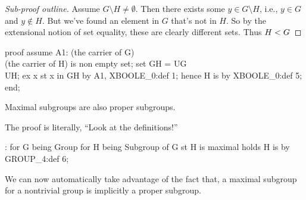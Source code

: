 \begin{proof}[Sub-proof outline]
Assume $G\setminus H\neq\emptyset$. Then there exists some $y\in
G\setminus H$, i.e., $y\in G$ and $y\notin H$. But we've found an
element in $G$ that's not in $H$. So by the extensional notion of set
equality, these are clearly different sets. Thus $H< G$
\end{proof}

\nwenddocs{}\endmoddef\nwstartdeflinemarkup{}\nwenddeflinemarkup
proof
  assume A1: (the carrier of G) \\ (the carrier of H) is non empty set;
  set GH = UG \\ UH;
  ex x st x in GH by A1, XBOOLE_0:def 1;
  hence H is  by XBOOLE_0:def 5;
end;
\nwendcode{}\nwdocspar

\begin{lemma}
Maximal subgroups are also proper subgroups.
\end{lemma}

The proof is literally, ``Look at the definitions!''

\nwenddocs{}\endmoddef\nwstartdeflinemarkup{}\nwenddeflinemarkup
{}:
  for G being Group
  for H being Subgroup of G
  st H is maximal
  holds H is  by GROUP_4:def 6;
\eatline
{}\nwendcode{}\nwdocspar
\begin{registration}
We can now automatically take advantage of the fact that, a maximal
subgroup for a nontrivial group is implicitly a proper subgroup.
\end{registration}

